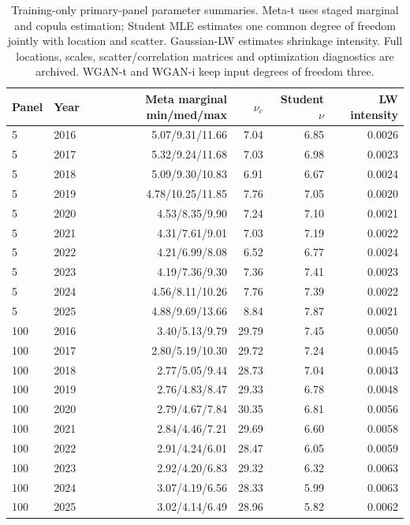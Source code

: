\documentclass[11pt]{article}
\theoremstyle{definition}\newtheorem{definition}[theorem]{Definition}
\theoremstyle{remark}\newtheorem{remark}[theorem]{Remark}
\begin{document}
\FloatBarrier
\begin{table}[htbp]
\centering\footnotesize
\setlength{\tabcolsep}{4pt}
\begin{tabular}{llrrrr}
\toprule
Panel & Year & Meta marginal min/med/max & $\nu_c$ & Student $\nu$ & LW intensity \\
\midrule
5 & 2016 & 5.07/9.31/11.66 & 7.04 & 6.85 & 0.0026 \\
5 & 2017 & 5.32/9.24/11.68 & 7.03 & 6.98 & 0.0023 \\
5 & 2018 & 5.09/9.30/10.83 & 6.91 & 6.67 & 0.0024 \\
5 & 2019 & 4.78/10.25/11.85 & 7.76 & 7.05 & 0.0020 \\
5 & 2020 & 4.53/8.35/9.90 & 7.24 & 7.10 & 0.0021 \\
5 & 2021 & 4.31/7.61/9.01 & 7.03 & 7.19 & 0.0022 \\
5 & 2022 & 4.21/6.99/8.08 & 6.52 & 6.77 & 0.0024 \\
5 & 2023 & 4.19/7.36/9.30 & 7.36 & 7.41 & 0.0023 \\
5 & 2024 & 4.56/8.11/10.26 & 7.76 & 7.39 & 0.0022 \\
5 & 2025 & 4.88/9.69/13.66 & 8.84 & 7.87 & 0.0021 \\
100 & 2016 & 3.40/5.13/9.79 & 29.79 & 7.45 & 0.0050 \\
100 & 2017 & 2.80/5.19/10.30 & 29.72 & 7.24 & 0.0045 \\
100 & 2018 & 2.77/5.05/9.44 & 28.73 & 7.04 & 0.0043 \\
100 & 2019 & 2.76/4.83/8.47 & 29.33 & 6.78 & 0.0048 \\
100 & 2020 & 2.79/4.67/7.84 & 30.35 & 6.81 & 0.0056 \\
100 & 2021 & 2.84/4.46/7.21 & 29.69 & 6.60 & 0.0058 \\
100 & 2022 & 2.91/4.24/6.01 & 28.47 & 6.05 & 0.0059 \\
100 & 2023 & 2.92/4.20/6.83 & 29.32 & 6.32 & 0.0063 \\
100 & 2024 & 3.07/4.19/6.56 & 28.33 & 5.99 & 0.0063 \\
100 & 2025 & 3.02/4.14/6.49 & 28.96 & 5.82 & 0.0062 \\
\bottomrule
\end{tabular}
\caption{Training-only primary-panel parameter summaries. Meta-t uses staged marginal and copula estimation; Student MLE estimates one common degree of freedom jointly with location and scatter. Gaussian-LW estimates shrinkage intensity. Full locations, scales, scatter/correlation matrices and optimization diagnostics are archived. WGAN-t and WGAN-i keep input degrees of freedom three.}\label{tab:r4-parameters}
\end{table}
\end{document}
